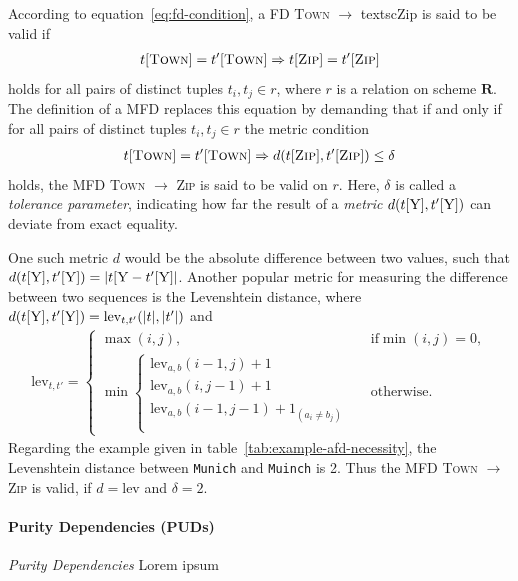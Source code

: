 According to equation~\ref{eq:fd-condition}, a FD \textsc{Town} \( \to\) textsc{Zip} is said to be valid if
\begin{align}
    t[\textsc{Town}] = t'[\textsc{Town}] \Rightarrow t[\textsc{Zip}] = t'[\textsc{Zip}]
\end{align}
holds for all pairs of distinct tuples \( t_i, t_j \in r \), where \( r \) is a relation on scheme \( \boldsymbol{R} \).
The definition of a MFD replaces this equation by demanding that if and only if for all pairs of distinct tuples \( t_i, t_j \in r \) the metric condition
\begin{align}\label{eq:mfd-condition}
    t[\textsc{Town}] = t'[\textsc{Town}] \Rightarrow d(t[\textsc{Zip}], t'[\textsc{Zip}]) \leq \delta
\end{align}
holds, the MFD \textsc{Town} \( \to\) \textsc{Zip} is said to be valid on \( r \).\cite[p.~2]{KOU09}
Here, \( \delta \) is called a \emph{tolerance parameter}, indicating how far the result of a \emph{metric} \( d(t[\textsc{Y}], t'[\textsc{Y}]) \) can deviate from exact equality.

One such metric \( d \) would be the absolute difference between two values, such that \( d(t[\textsc{Y}], t'[\textsc{Y}]) = | t[\textsc{Y} - t'[\textsc{Y}]| \).
Another popular metric for measuring the difference between two sequences is the Levenshtein distance, where \( d(t[\textsc{Y}], t'[\textsc{Y}]) = \text{lev}_{t,t'}(|t|, |t'|) \) and
\begin{align*}
    \text{lev}_{t,t'} =
    \begin{cases}
        \max(i,j),  & \text{if} \min(i,j)=0, \\
        \min \begin{cases}
            \text{lev}_{a, b}(i-1, j)+1 & \\
            \text{lev}_{a, b}(i, j-1)+1 & \\
            \text{lev}_{a, b}(i-1, j-1)+1_{(a_i \neq b_j)} \\
        \end{cases} & \text{otherwise.}
    \end{cases}
\end{align*}
Regarding the example given in table~\ref{tab:example-afd-necessity}, the Levenshtein distance between \texttt{Munich} and \texttt{Muinch} is 2.
Thus the MFD \textsc{Town} \( \to\) \textsc{Zip} is valid, if \( d = \text{lev} \) and \( \delta = 2 \).

\paragraph{Purity Dependencies (PUDs)}
\emph{Purity Dependencies} Lorem ipsum

